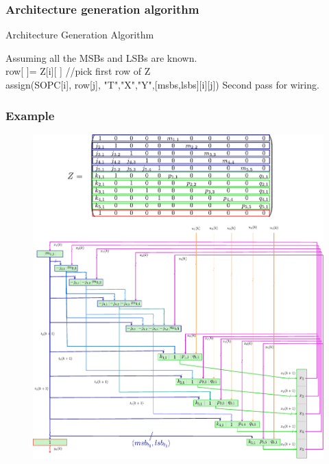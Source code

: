\begin{frame}
	\frametitle{Architecture generation algorithm}
	\begin{algorithm}[H]
	\caption{Architecture Generation Algorithm}
	Assuming all the MSBs and LSBs are known. \\
	 {
	 	row[ ]= Z[i][ ] //pick first row of Z \\
	 	 {
	 		assign(SOPC[i], row[j], {"T","X","Y"},[msbs,lsbs][i][j])
	 	}
		Second pass for wiring.
	}
	\end{algorithm}

\end{frame}

\begin{frame}
	\frametitle{Example}
	\begin{figure}
		\includegraphics[scale=0.4]{pictures/exampleGreenFull.pdf}
	\end{figure}
\end{frame}

